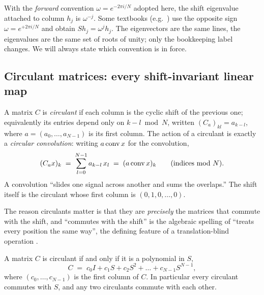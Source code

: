 \begin{remark}
With the \emph{forward} convention $\omega = e^{-2\pi i/N}$ adopted here, the shift
eigenvalue attached to column $h_j$ is $\omega^{-j}$. Some textbooks
(e.g.\ \citep{fourier_mit1806,fourier_rutgers}) use the opposite sign $\omega =
e^{+2\pi i/N}$ and obtain $S h_j = \omega^{j} h_j$. The eigenvectors are the same lines,
the eigenvalues are the same set of roots of unity; only the bookkeeping label changes.
We will always state which convention is in force.
\end{remark}

\subsection{Circulant matrices: every shift-invariant linear map}

\begin{definition}
\label{def:circulant}
A matrix $C$ is \emph{circulant} if each column is the cyclic shift of the previous one;
equivalently its entries depend only on $k - l \bmod N$, written $(C_a)_{kl} =
a_{k-l}$, where $a = (a_0,\dots,a_{N-1})$ is its first column. The action of a circulant
is exactly a \emph{circular convolution}: writing $a \operatorname{conv} x$ for the convolution,
\[
  (C_a x)_k \;=\; \sum_{l=0}^{N-1} a_{k-l}\, x_l \;=\; (a \operatorname{conv} x)_k \qquad
  (\text{indices mod } N).
\]
A convolution ``slides one signal across another and sums the overlaps.'' The shift
itself is the circulant whose first column is $(0,1,0,\dots,0)$.
\end{definition}

The reason circulants matter is that they are \emph{precisely} the matrices that
commute with the shift, and ``commutes with the shift'' is the algebraic spelling of
``treats every position the same way'', the defining feature of a translation-blind
operation \citep{fourier_bamieh,groups_bronstein}.

\begin{lemma}
\label{lem:polyS}
A matrix $C$ is circulant if and only if it is a polynomial in $S$,
\[
  C \;=\; c_0 I + c_1 S + c_2 S^2 + \dots + c_{N-1} S^{N-1},
\]
where $(c_0,\dots,c_{N-1})$ is the first column of $C$. In particular every circulant
commutes with $S$, and any two circulants commute with each other.
\end{lemma}

